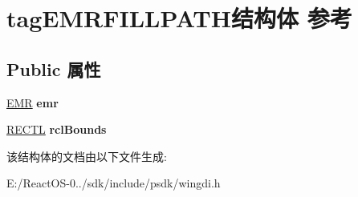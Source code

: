 \hypertarget{structtag_e_m_r_f_i_l_l_p_a_t_h}{}\section{tag\+E\+M\+R\+F\+I\+L\+L\+P\+A\+T\+H结构体 参考}
\label{structtag_e_m_r_f_i_l_l_p_a_t_h}
\subsection*{Public 属性}
\begin{DoxyCompactItemize}
\item 
\mbox{\label{structtag_e_m_r_f_i_l_l_p_a_t_h_ac3f9c1a04722e308e670ffb1fbbee0df}} 
\hyperlink{structtag_e_m_r}{E\+MR} {\bfseries emr}
\item 
\mbox{\label{structtag_e_m_r_f_i_l_l_p_a_t_h_a6c1b82dd4e09ed6b16e24f55495d8135}} 
\hyperlink{struct___r_e_c_t_l}{R\+E\+C\+TL} {\bfseries rcl\+Bounds}
\end{DoxyCompactItemize}


该结构体的文档由以下文件生成\+:\begin{DoxyCompactItemize}
\item 
E\+:/\+React\+O\+S-\/0../sdk/include/psdk/wingdi.\+h\end{DoxyCompactItemize}
